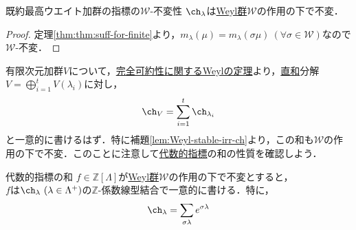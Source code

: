\documentclass[rep_main]{subfiles}
\begin{document}
\begin{mylem}[label=lem:Weyl-stable-irr-ch]{既約最高ウエイト加群の指標の$\mathscr{W}$-不変性}
	$\ch_\lambda$は\hyperref[def:Weylgroup]{Weyl群}$\mathscr{W}$の作用の下で不変．
\end{mylem}
\begin{proof}
	定理\ref{thm:thm:suff-for-finite}より，$m_\lambda(\mu) = m_\lambda(\sigma\mu)\ (\forall \sigma \in \mathscr{W})$なので$\mathscr{W}$-不変．
\end{proof}
有限次元加群$V$について，\hyperref[thm:Weyl]{完全可約性に関するWeylの定理}より，\hyperref[def:gmod-directsum]{直和}分解$V = \bigoplus_{i=1}^t V(\lambda_i)$に対し，
\begin{equation}
	\ch_V = \sum_{i=1}^t \ch_{\lambda_i}
\end{equation}
と一意的に書けるはず．特に補題\ref{lem:Weyl-stable-irr-ch}より，この和も$\mathscr{W}$の作用の下で不変．このことに注意して\hyperref[def:alg-character]{代数的指標}の和の性質を確認しよう．
\begin{myprop}[label=prop:alg-character-add]{代数的指標の和}
	$f \in \mathbb{Z}[\Lambda]$が\hyperref[def:Weylgroup]{Weyl群}$\mathscr{W}$の作用の下で不変とすると，\\
	$f$は$\ch_\lambda\ (\lambda \in \Lambda^+)$の$\mathbb{Z}$-係数線型結合で一意的に書ける．特に，
	\begin{equation}
		\ch_\lambda = \sum_{\sigma\lambda} e^{\sigma\lambda}
	\end{equation}
\end{myprop}
\end{document}
